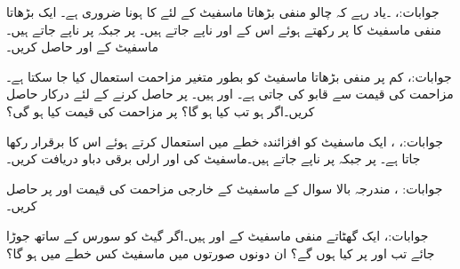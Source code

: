 جوابات:، ۔یاد رہے کہ چالو منفی بڑھاتا ماسفیٹ کے لئے  کا ہونا ضروری ہے۔
ایک بڑھاتا منفی ماسفیٹ کا  پر رکھتے ہوئے اس کے  اور  ناپے جاتے ہیں۔ پر  جبکہ  پر  ناپے جاتے ہیں۔ماسفیٹ کے  اور  حاصل کریں۔

جوابات:، 
کم  پر منفی بڑھاتا ماسفیٹ کو بطور متغیر مزاحمت استعمال کیا جا سکتا ہے۔مزاحمت کی قیمت  سے قابو کی جاتی ہے۔ اور  ہیں۔ پر  حاصل کرنے کے لئے درکار  حاصل کریں۔اگر  ہو تب  کیا ہو گا؟ پر مزاحمت کی قیمت کیا ہو گی؟

جوابات:، ، 
ایک ماسفیٹ کو افزائندہ خطے میں استعمال کرتے ہوئے اس کا  برقرار رکھا جاتا ہے۔  پر  جبکہ  پر  ناپے جاتے ہیں۔ماسفیٹ کی  اور ارلی برقی دباو  دریافت کریں۔

جوابات: ، 
مندرجہ بالا سوال کے ماسفیٹ کے خارجی مزاحمت  کی قیمت  اور   پر حاصل کریں۔

جوابات:، 
ایک گھٹاتے منفی ماسفیٹ کے  اور  ہیں۔اگر گیٹ کو سورس کے ساتھ جوڑا جائے تب  اور  پر  کیا ہوں گے؟ ان دونوں صورتوں میں ماسفیٹ کس خطے میں ہو گا؟

